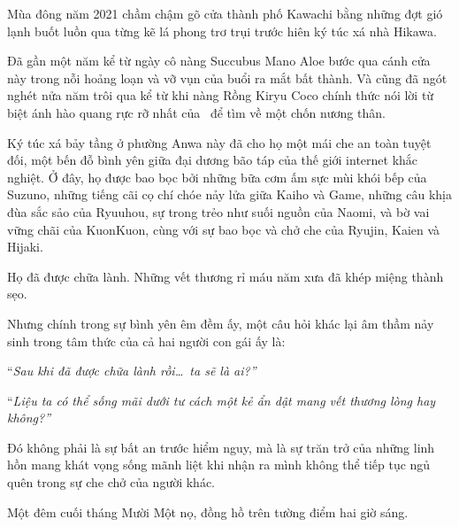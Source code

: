 ﻿\documentclass[../main.tex]{subfiles}
\begin{document}

Mùa đông năm 2021 chầm chậm gõ cửa thành phố Kawachi bằng những đợt gió lạnh buốt luồn qua từng kẽ lá phong trơ trụi trước hiên ký túc xá nhà Hikawa.

Đã gần một năm kể từ ngày cô nàng Succubus Mano Aloe bước qua cánh cửa này trong nỗi hoảng loạn và vỡ vụn của buổi ra mắt bất thành. Và cũng đã ngót nghét nửa năm trôi qua kể từ khi nàng Rồng Kiryu Coco chính thức nói lời từ biệt ánh hào quang rực rỡ nhất của \hll\ để tìm về một chốn nương thân.

Ký túc xá bảy tầng ở phường Anwa này đã cho họ một mái che an toàn tuyệt đối, một bến đỗ bình yên giữa đại dương bão táp của thế giới internet khắc nghiệt. Ở đây, họ được bao bọc bởi những bữa cơm ấm sực mùi khói bếp của Suzuno, những tiếng cãi cọ chí chóe nảy lửa giữa Kaiho và Game, những câu khịa đùa sắc sảo của Ryuuhou, sự trong trẻo như suối nguồn của Naomi, và bờ vai vững chãi của KuonKuon, cùng với sự bao bọc và chở che của Ryujin, Kaien và Hijaki.

Họ đã được chữa lành. Những vết thương rỉ máu năm xưa đã khép miệng thành sẹo.

Nhưng chính trong sự bình yên êm đềm ấy, một câu hỏi khác lại âm thầm nảy sinh trong tâm thức của cả hai người con gái ấy là:

``\textit{Sau khi đã được chữa lành rồi\dots\ ta sẽ là ai?''}

``\textit{Liệu ta có thể sống mãi dưới tư cách một kẻ ẩn dật mang vết thương lòng hay không?''}

Đó không phải là sự bất an trước hiểm nguy, mà là sự trăn trở của những linh hồn mang khát vọng sống mãnh liệt khi nhận ra mình không thể tiếp tục ngủ quên trong sự che chở của người khác.

\ct

Một đêm cuối tháng Mười Một nọ, đồng hồ trên tường điểm hai giờ sáng.
\end{document}
